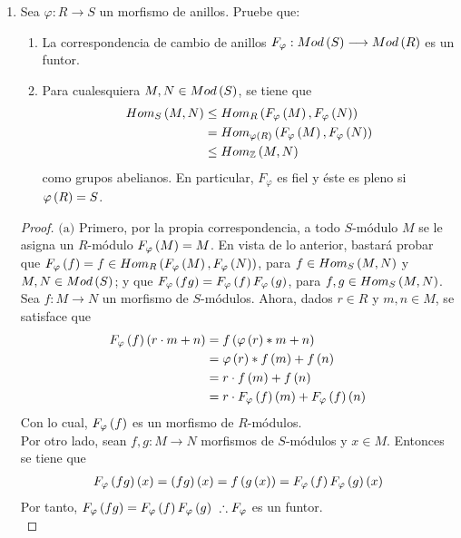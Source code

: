 \documentclass{article}
\begin{document}
\begin{enumerate}[label=\textbf{Ej \arabic*.}]
		\item Sea $\varphi : R \longrightarrow S$ un morfismo de anillos. Pruebe que:
		\begin{enumerate}
			\item La correspondencia de cambio de anillos $F_{\varphi} : Mod\left(S\right) \longrightarrow Mod\left(R\right)$ es un funtor.
			\item Para cualesquiera $M,N \in Mod\left(S\right)$, se tiene que
			\begin{align*}
				Hom_{S}\left(M,N\right) &\leq Hom_{R}\left(F_{\varphi}\left(M\right),F_{\varphi}\left(N\right)\right)\\
				&= Hom_{\varphi \left(R\right)}\left(F_{\varphi}\left(M\right),F_{\varphi}\left(N\right)\right)\\
				&\leq Hom_{\mathbb{Z}}\left(M,N\right)
			\end{align*}
			como grupos abelianos. En particular, $F_{\varphi}$ es fiel y éste es pleno si $\varphi \left(R\right)=S$.
		\end{enumerate}
		\begin{proof}
			$\boxed{\text{(a)}}$ Primero, por la propia correspondencia, a todo $S$-módulo $M$ se le asigna un $R$-módulo $F_{\varphi} \left(M\right)=M$. En vista de lo anterior, bastará probar que $F_{\varphi}\left(f\right) = f \in Hom_{R}\left(F_{\varphi}\left(M\right),F_{\varphi}\left(N\right)\right)$, para $f \in Hom_{S}\left(M,N\right)$ y $M,N \in Mod\left(S\right)$; y que $F_{\varphi}\left(fg\right)=F_{\varphi}\left(f\right)F_{\varphi}\left(g\right)$, para $f,g\in Hom_{S}\left(M,N\right)$.\\
			
			Sea $f:M \longrightarrow N$ un morfismo de $S$-módulos. Ahora, dados $r \in R$ y $m,n \in M$, se satisface que
			\begin{align*}
				F_{\varphi}\left(f\right)\left(r \cdot m + n\right)&=f\left(\varphi\left(r\right)*m+n\right)\\
				&=\varphi \left(r\right)*f\left(m\right)+f\left(n\right)\\
				&=r \cdot f\left(m\right)+f\left(n\right)\\
				&=r \cdot F_{\varphi} \left(f\right)\left(m\right)+F_{\varphi} \left(f\right)\left(n\right)
			\end{align*}
			Con lo cual, $F_{\varphi} \left(f\right)$ es un morfismo de $R$-módulos.\\
			
			Por otro lado, sean $f,g:M \longrightarrow N$ morfismos de $S$-módulos y $x \in M$. Entonces se tiene que
			\begin{align*}
				F_{\varphi}\left(fg\right)\left(x\right)=\left(fg\right)\left(x\right)=f\left(g\left(x\right)\right)=F_{\varphi}\left(f\right)F_{\varphi}\left(g\right)\left(x\right)
			\end{align*}
			Por tanto, $F_{\varphi}\lrprth{fg}=F_{\varphi}\lrprth{f}F_{\varphi}\lrprth{g}\ \therefore F_{\varphi}$ es un funtor.\\
			

\end{proof}
\end{enumerate}
\end{document}

